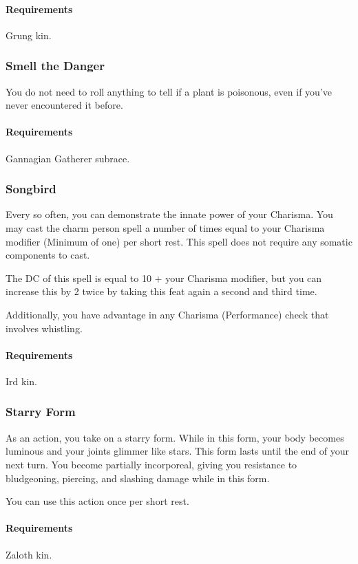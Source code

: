     \paragraph{Requirements} Grung kin.
\subsubsection{Smell the Danger} \label{feat::smellthedanger}
    You do not need to roll anything to tell if a plant is poisonous, even if you've never encountered it before.
    \paragraph{Requirements} Gannagian Gatherer subrace.
\subsubsection{Songbird} \label{feat::songbird}
    Every so often, you can demonstrate the innate power of your Charisma.
    You may cast the charm person spell a number of times equal to your Charisma modifier (Minimum of one) per short rest.
    This spell does not require any somatic components to cast.

    The DC of this spell is equal to 10 + your Charisma modifier, but you can increase this by 2 twice by taking this feat again a second and third time.

    Additionally, you have advantage in any Charisma (Performance) check that involves whistling.
    \paragraph{Requirements} Ird kin.
\subsubsection{Starry Form} \label{feat::starryform}
    As an action, you take on a starry form.
    While in this form, your body becomes luminous and your joints glimmer like stars.
    This form lasts until the end of your next turn.
    You become partially incorporeal, giving you resistance to bludgeoning, piercing, and slashing damage while in this form.

    You can use this action once per short rest.
    \paragraph{Requirements} Zaloth kin.
